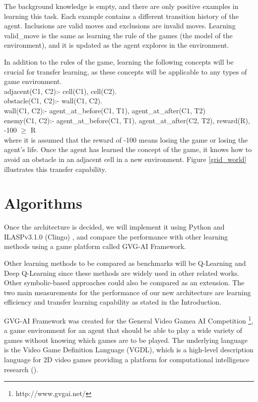 The background knowledge is empty, and there are only positive examples in learning this task. Each example contains a different transition history of the agent. 
Inclusions are valid moves and exclusions are invalid moves. 
Learning valid\_move is the same as learning the rule of the games (the model of the environment), and it is updated as the agent explores in the environment.

In addition to the rules of the game, learning the following concepts will be crucial for transfer learning, as these concepts will be applicable to any types of game environment.  \\

adjacent(C1, C2):- cell(C1), cell(C2). \\
obstacle(C1, C2):- wall(C1, C2). \\
wall(C1, C2):- agent\_at\_before(C1, T1), agent\_at\_after(C1, T2) \\
enemy(C1, C2):- agent\_at\_before(C1, T1), agent\_at\_after(C2, T2), reward(R), -100 $\geq$ R \\

where it is assumed that the reward of -100 means losing the game or losing the agent's life. 
Once the agent has learned the concept of the game, it knows how to avoid an obstacle in an adjacent cell in a new environment. 
Figure \ref{grid_world} illustrates this transfer capability.

\section{Algorithms}
\label{algorithms}

Once the architecture is decided, we will implement it using Python and ILASPv3.1.0 (Clingo) \cite{Law2017}, and compare the performance with other learning methods using a game platform called GVG-AI Framework.

Other learning methods to be compared as benchmarks will be Q-Learning and Deep Q-Learning since these methods are widely used in other related works. 
Other symbolic-based approaches could also be compared as an extension. 
The two main measurements for the performance of our new architecture are learning efficiency and transfer learning capability as stated in the Introduction.

GVG-AI Framework was created for the General Video Gamea AI Competition \footnote{http://www.gvgai.net/}, 
a game environment for an agent that should be able to play a wide variety of games without knowing which games are to be played.
The underlying language is the Video Game Definition Language (VGDL), which is a high-level description language for 2D video games providing a platform for computational intelligence research (\cite{Schaul2013}).

